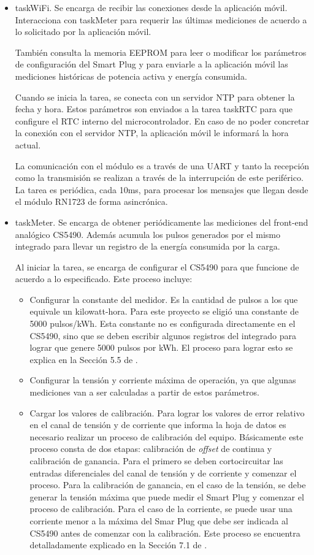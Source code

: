 \begin{itemize}
\item taskWiFi. Se encarga de recibir las conexiones desde la aplicación móvil. Interacciona con taskMeter para requerir las últimas mediciones de acuerdo a lo solicitado por la aplicación móvil.

También consulta la memoria EEPROM para leer o modificar los parámetros de configuración del Smart Plug y para enviarle a la aplicación móvil las mediciones históricas de potencia activa y energía consumida.

Cuando se inicia la tarea, se conecta con un servidor NTP para obtener la fecha y hora. Estos parámetros son enviados a la tarea taskRTC para que configure el RTC interno del microcontrolador. En caso de no poder concretar la conexión con el servidor NTP, la aplicación móvil le informará la hora actual.

La comunicación con el módulo es a través de una UART y tanto la recepción como la transmisión se realizan a través de la interrupción de este periférico. La tarea es periódica, cada 10ms, para procesar los mensajes que llegan desde el módulo RN1723  de forma asincrónica.

\item taskMeter. Se encarga de obtener periódicamente las mediciones del front-end analógico CS5490. Además acumula los pulsos generados por el mismo integrado para llevar un registro de la energía consumida por la carga.

Al iniciar la tarea, se encarga de configurar el CS5490 para que funcione de acuerdo a lo especificado. Este proceso incluye:

\begin{itemize}
\item Configurar la constante del medidor. Es la cantidad de pulsos a los que equivale un kilowatt-hora. Para este proyecto se eligió una constante de 5000 pulsos/kWh. Esta constante no es configurada directamente en el CS5490, sino que se deben escribir algunos registros del integrado para lograr que genere 5000 pulsos por kWh. El proceso para lograr esto se explica en la Sección 5.5 de \citep{datasheet_CS5490}.
\item Configurar la tensión y corriente máxima de operación, ya que algunas mediciones van a ser calculadas a partir de estos parámetros.
\item Cargar los valores de calibración. Para lograr los valores de error relativo en el canal de tensión y de corriente que informa la hoja de datos es necesario realizar un proceso de calibración del equipo. Básicamente este proceso consta de dos etapas: calibración de \textit{offset} de continua y calibración de ganancia. Para el primero se deben cortocircuitar las entradas diferenciales del canal de tensión y de corriente y comenzar el proceso. Para la calibración de ganancia, en el caso de la tensión, se debe generar la tensión máxima que puede medir el Smart Plug y comenzar el proceso de calibración. Para el caso de la corriente, se puede usar una corriente menor a la máxima del Smar Plug que debe ser indicada al CS5490 antes de comenzar con la calibración.
Este proceso se encuentra detalladamente explicado en la Sección 7.1 de \citep{datasheet_CS5490}.


\end{itemize}
\end{itemize}
